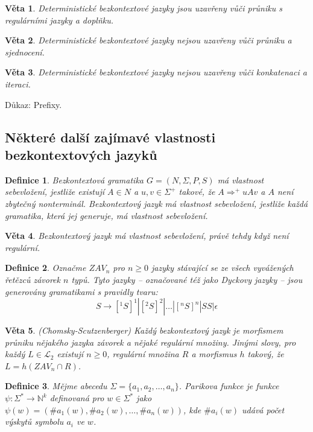 \documentclass[a4paper, 11pt]{report}
\newtheorem{mydef}{Definice}[chapter]
\newtheorem{veta}{Věta}[chapter]
\begin{document}
\begin{veta}
Deterministické bezkontextové jazyky jsou uzavřeny vůči průniku s regulárními jazyky a doplňku.
\end{veta}

\begin{veta}
Deterministické bezkontextové jazyky \emph{nejsou} uzavřeny vůči průniku a sjednocení.
\end{veta}

\begin{veta}
Deterministické bezkontextové jazyky \emph{nejsou} uzavřeny vůči konkatenaci a iteraci.
\end{veta}
Důkaz: Prefixy.

\subsection{Některé další zajímavé vlastnosti bezkontextových jazyků}

\begin{mydef}
Bezkontextová gramatika $G = (N, \Sigma, P, S)$ má vlastnost sebevložení, jestliže existují $A \in N$ a $ u,v \in \Sigma^+$ takové, že $A \Rightarrow^+ uAv$ a $A$ není zbytečný nonterminál. Bezkontextový jazyk má vlastnost sebevložení, jestliže každá gramatika, která jej generuje, má vlastnost sebevložení.
\end{mydef}

\begin{veta}
Bezkontextový jazyk má vlastnost sebevložení, právě tehdy když není regulární.
\end{veta}

\begin{mydef}
Označme $ZAV_n$  pro $n \geq 0$ jazyky stávající se ze všech vyvážených řetězců závorek $n$ typů. Tyto jazyky -- označované též jako Dyckovy jazyky -- jsou generovány gramatikami s pravidly tvaru:
$$S \to [^1 S ]^1 | [^2 S ]^2 | \dots | [^n S ]^n | SS | \epsilon $$
\end{mydef}

\begin{veta}
(Chomsky-Scutzenberger) Každý bezkontextový jazyk je morfismem průniku nějakého jazyka závorek a nějaké regulární množiny. Jinými slovy, pro každý $L \in \mathcal{L}_2$ existují $n \geq 0$, regulární množina $R$ a morfismus $h$ takový, že $L = h( ZAV_n \cap R)$.
\end{veta}

\begin{mydef}
Mějme abecedu $\Sigma = \{a_1, a_2, \dots, a_n\}$. \emph{Parikova funkce} je funkce $\psi: \Sigma^* \to \mathbb{N}^k$ definovaná pro $w \in \Sigma^*$ jako $\psi(w) = (\#a_1(w), \#a_2(w), \dots, \#a_n(w))$, kde $\#a_i(w)$ udává počet výskytů symbolu $a_i$ ve $w$.
\end{mydef}
\end{document}
